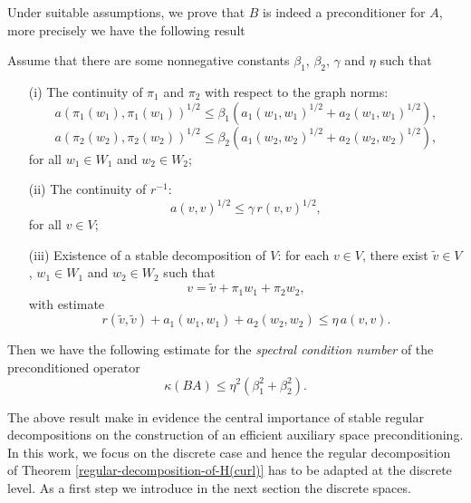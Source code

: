 Under suitable assumptions, we prove that $B$ is indeed a  preconditioner for $A$, more precisely we have the following result
\begin{theorem}{\cite[Theorem 2.2]{hiptmair2007nodal}} \label{th:ASP-lemma}
Assume that there are some nonnegative constants $\beta_1$, $\beta_2$, $\gamma$ and $\eta$ such that
\begin{itemize}
\item[(i)] The continuity of $\pi_1$ and $\pi_2$ with respect to the graph norms:
\begin{equation*}
a\left(\pi_1 (w_1),\pi_1 (w_1)\right)^{1/2} \leq \beta_1 \left( a_1(w_1,w_1)^{1/2}+ a_2(w_1,w_1)^{1/2}\right),
\end{equation*} 
\begin{equation*}
a\left(\pi_2 (w_2),\pi_2 (w_2)\right)^{1/2} \leq \beta_2 \left( a_1(w_2,w_2)^{1/2}+ a_2(w_2,w_2)^{1/2}\right), 
\end{equation*} 
for all $w_1 \in W_1$ and $w_2 \in W_2$;

\item[(ii)]  The continuity of $r^{-1}$:
\begin{equation*}
a(v,v)^{1/2} \leq \gamma \,r(v,v)^{1/2},
\end{equation*}
for all $v \in V$;

\item[(iii)] Existence of a stable decomposition of $V$: for each $v \in V$, there exist $\widetilde{v} \in V$, $w_1 \in W_1$ and $w_2 \in W_2$ such that 
\begin{equation*}
v=\widetilde{v}+\pi_1 w_1 + \pi_2 w_2,
\end{equation*}
with estimate 
\begin{equation*}
r(\widetilde{v},\widetilde{v}) + a_1(w_1,w_1) + a_2(w_2,w_2) \leq \eta \, a(v,v).
\end{equation*} 
\end{itemize}
Then we have the following estimate for the {\em spectral condition number} of the preconditioned operator
\begin{equation*}
\kappa(BA) \leq \eta^2 (\beta_1^2+\beta_2^2).
\end{equation*}
\end{theorem}

The above result make in evidence the central importance of stable regular decompositions on the construction of an efficient auxiliary space preconditioning. In this work, we focus on the discrete case and hence the regular decomposition of Theorem \ref{regular-decomposition-of-H(curl)} has to be adapted at the discrete level. As a first step we introduce in the next section the discrete spaces.

